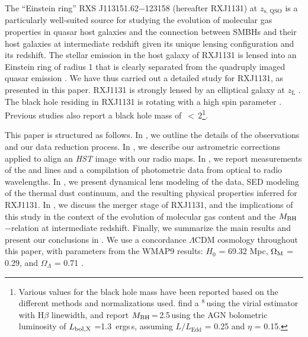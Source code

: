 \documentclass[]{emulateapj}
\begin{document}
The ``Einstein ring'' RXS J113151.62$-$123158 (hereafter RXJ1131) 
at $z_\textrm{s, QSO}$ \citep[hereafter S03]{Sluse03a} is a particularly well-suited source for
studying the evolution of molecular gas properties in quasar host galaxies and the 
connection between SMBHs and their host galaxies at intermediate redshift
given its unique lensing configuration and its redshift.
The stellar emission in the host galaxy of RXJ1131 is lensed into
an Einstein ring of radius 1
that is clearly separated from the quadruply imaged quasar emission \citep[hereafter C06]{Claeskens06a}.
We have thus carried out a detailed study for RXJ1131, as presented in this paper.
RXJ1131 is strongly lensed by an elliptical galaxy at $z_\textrm{L}$ .
The black hole residing in RXJ1131 is rotating with a high spin parameter
\citep[$a$\,$\sim$\,0.9;][]{Reis14a}. 
Previous studies also report a black hole mass of
\mbh\,$<$\,2\Msun\footnote{Various values for the black hole 
mass have been reported based on the different methods and normalizations used. \citet{Dai10a} find a 
\mbh{}$^{8}$\,\Msun using the virial estimator with H$\beta$ linewidth,
and \citet{Pooley07a} report $M_{\rm BH}$\,=\,2.5\,\Msun using the
AGN bolometric luminosity of $L_{\rm bol, X}$ =1.3\, ergs\,s\pmOne, 
assuming $L$$/$$L_\textrm{Edd}$ = 0.25 and $\eta$ = 0.15.}.

This paper is structured as follows.
In , we outline the details of the observations and our data reduction process.
In , we describe our astrometric corrections applied to align an {\it HST} image with our radio maps.
In , we report measurements of the \bco and \cco lines and a compilation of photometric data from optical to radio wavelengths.
In , we present dynamical lens modeling of the \bco data, SED modeling of the thermal dust continuum, 
and the resulting physical properties inferred for RXJ1131.
In , we discuss the merger stage of RXJ1131, and the implications of 
this study in the context of the evolution of molecular gas content
and the $M_{\rm BH}$$-$\mdyn relation at intermediate redshift.
Finally, we summarize the main results and present our conclusions in .
We use a concordance $\Lambda$CDM cosmology throughout this paper, with
parameters from the WMAP9 results:
$H_0$ = 69.32 \kms Mpc\pmOne, $\Omega_{\rm M}$ = 0.29, and
$\Omega_{\Lambda}$ = 0.71 \citep{Hinshaw13a}.
\end{document}
